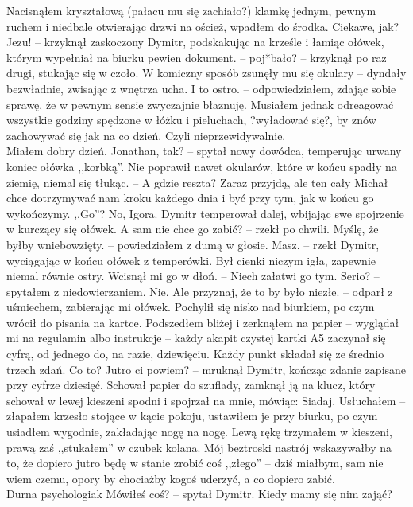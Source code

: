\documentclass[../MAIN.tex]{subfiles}
\begin{document}
Nacisnąłem kryształową (pałacu mu się zachiało?) klamkę jednym, pewnym ruchem i niedbale otwierając drzwi na oścież, wpadłem do środka. Ciekawe, jak?
\sx Jezu! -- krzyknął zaskoczony Dymitr, podskakując na krześle i łamiąc ołówek, którym wypełniał na biurku pewien dokument. -- poj*bało? -- krzyknął po raz drugi, stukając się w czoło. W komiczny sposób zsunęły mu się okulary -- dyndały bezwładnie, zwisając z wnętrza ucha.
\xx I to ostro. -- odpowiedziałem, zdając sobie sprawę, że w pewnym sensie zwyczajnie błaznuję.
\qd
Musiałem jednak odreagować wszystkie godziny spędzone w łóżku i pieluchach, ?wyładować się?, by znów zachowywać się jak na co dzień. Czyli nieprzewidywalnie.\\
Miałem dobry dzień.
\sx Jonathan, tak? -- spytał nowy dowódca, temperując urwany koniec ołówka ,,korbką''. Nie poprawił nawet okularów, które w końcu spadły na ziemię, niemal się tłukąc. -- A gdzie reszta?
\xx Zaraz przyjdą, ale ten cały Michał chce dotrzymywać nam kroku każdego dnia i być przy tym, jak w końcu go wykończymy.
\xx ,,Go''?
\xx No, Igora.
\qd
Dymitr temperował dalej, wbijając swe spojrzenie w kurczący się ołówek.
\sx A sam nie chce go zabić? -- rzekł po chwili.
\xx Myślę, że byłby wniebowzięty. -- powiedziałem z dumą w głosie.
\xx Masz. -- rzekł Dymitr, wyciągając w końcu ołówek z temperówki. Był cienki niczym igła, zapewnie niemal równie ostry. Wcisnął mi go w dłoń. -- Niech załatwi go tym.
\xx Serio? -- spytałem z niedowierzaniem.
\xx Nie. Ale przyznaj, że to by było niezłe. -- odparł z uśmiechem, zabierając mi ołówek.
\qd
Pochylił się nisko nad biurkiem, po czym wrócił do pisania na kartce. Podszedłem bliżej i zerknąłem na papier -- wyglądał mi na regulamin albo instrukcje -- każdy akapit czystej kartki A5 zaczynał się cyfrą, od jednego do, na razie, dziewięciu. Każdy punkt składał się ze średnio trzech zdań.
\sx Co to?
\qd Jutro ci powiem? -- mruknął Dymitr, kończąc zdanie zapisane przy cyfrze dziesięć. Schował papier do szuflady, zamknął ją na klucz, który schował w lewej kieszeni spodni i spojrzał na mnie, mówiąc:
\sx Siadaj.
\qd
Usłuchałem -- złapałem krzesło stojące w kącie pokoju, ustawiłem je przy biurku, po czym usiadłem wygodnie, zakładając nogę na nogę. Lewą rękę trzymałem w kieszeni, prawą zaś ,,stukałem'' w czubek kolana. Mój beztroski nastrój wskazywałby na to, że dopiero jutro będę w stanie zrobić coś ,,złego'' -- dziś miałbym, sam nie wiem czemu, opory by chociażby kogoś uderzyć, a co dopiero zabić.\\
Durna psychologia\3k
\sx Mówiłeś coś? -- spytał Dymitr.
\xx Kiedy mamy się nim zająć?
\end{document}
